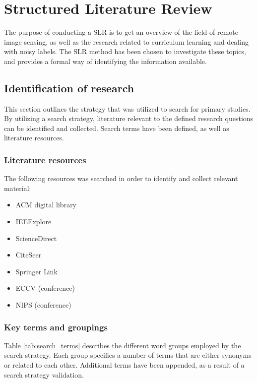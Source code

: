 \section{Structured Literature Review}
The purpose of conducting a \ac{SLR} is to get an overview of the field of remote image sensing, as well as the research related to curriculum learning and dealing with noisy labels. The \ac{SLR} method has been chosen to investigate these topics, and provides a formal way of identifying the information available.

\subsection{Identification of research}
This section outlines the strategy that was utilized to search for primary studies. By utilizing a search strategy, literature relevant to the defined research questions can be identified and collected. Search terms have been defined, as well as literature resources.

\subsubsection{Literature resources}
\label{sec:literature_resources}
The following resources was searched in order to identify and collect relevant material:
\begin{itemize}
	\item ACM digital library
	\item IEEExplore
	\item ScienceDirect
	\item CiteSeer
	\item Springer Link
	\item ECCV (conference)
	\item NIPS (conference)
\end{itemize}

\subsubsection{Key terms and groupings}
Table \ref{tab:search_terms} describes the different word groups employed by the search strategy. Each group specifies a number of terms that are either synonyms or related to each other. Additional terms have been appended, as a result of a search strategy validation.


